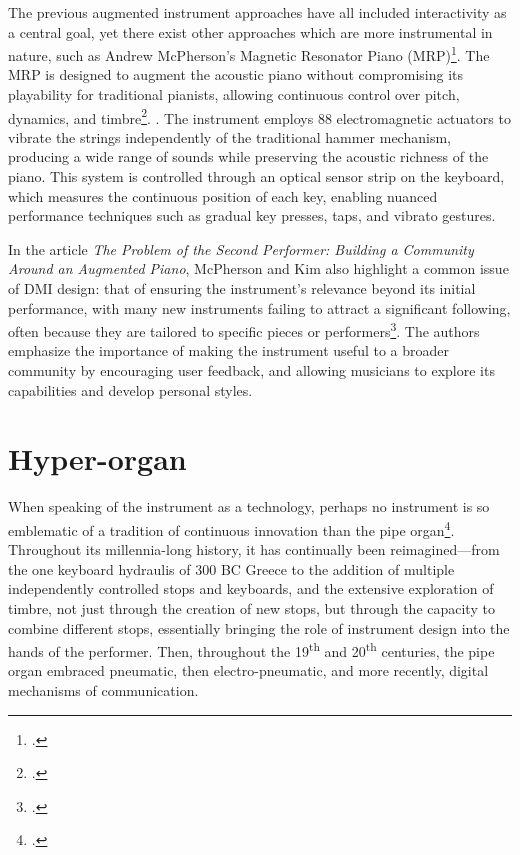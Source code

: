 \documentclass[12pt,twoside,maitrise]{dms_ks}
\theoremstyle{definition}
\begin{document}
{The previous augmented instrument approaches have all included interactivity as a central goal, yet there exist other approaches which are more instrumental in nature, such as Andrew McPherson's Magnetic Resonator Piano (MRP)\footcite{andrew_mcpherson_magnetic_2010}.
The MRP is designed to augment the acoustic piano without compromising its playability for traditional pianists, allowing continuous control over pitch, dynamics, and timbre\footcite[10]{mcpherson_problem_2012}. 
.
The instrument employs 88 electromagnetic actuators to vibrate the strings independently of the traditional hammer mechanism, producing a wide range of sounds while preserving the acoustic richness of the piano. 
This system is controlled through an optical sensor strip on the keyboard, which measures the continuous position of each key, enabling nuanced performance techniques such as gradual key presses, taps, and vibrato gestures.

In the article \textit{The Problem of the Second Performer: Building a Community Around an Augmented Piano}, McPherson and Kim also highlight a common issue of DMI design: that of ensuring the instrument's relevance beyond its initial performance, with many new instruments failing to attract a significant following, often because they are tailored to specific pieces or performers\footcite[10--11]{mcpherson_problem_2012}. 
The authors emphasize the importance of making the instrument useful to a broader community by encouraging user feedback, and allowing musicians to explore its capabilities and develop personal styles.

\section{Hyper-organ}

When speaking of the instrument as a technology, perhaps no instrument is so emblematic of a tradition of continuous innovation than the pipe organ\footcite[35]{peters_how_2014}. 
Throughout its millennia-long history, it has continually been reimagined---from the one keyboard hydraulis of 300 BC Greece to the addition of multiple independently controlled stops and keyboards, and the extensive exploration of timbre, not just through the creation of new stops, but through the capacity to combine different stops, essentially bringing the role of instrument design into the hands of the performer. 
Then, throughout the 19\textsuperscript{th} and 20\textsuperscript{th} centuries, the pipe organ embraced pneumatic, then electro-pneumatic, and more recently, digital mechanisms of communication. 

}
\end{document}
